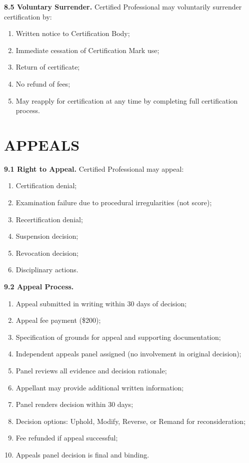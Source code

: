 \documentclass[11pt,a4paper]{article}
\begin{document}
\textbf{8.5 Voluntary Surrender.} Certified Professional may voluntarily surrender certification by:

\begin{enumerate}[label=\alph*)]
\item Written notice to Certification Body;
\item Immediate cessation of Certification Mark use;
\item Return of certificate;
\item No refund of fees;
\item May reapply for certification at any time by completing full certification process.
\end{enumerate}

\section{APPEALS}

\textbf{9.1 Right to Appeal.} Certified Professional may appeal:

\begin{enumerate}[label=\alph*)]
\item Certification denial;
\item Examination failure due to procedural irregularities (not score);
\item Recertification denial;
\item Suspension decision;
\item Revocation decision;
\item Disciplinary actions.
\end{enumerate}

\textbf{9.2 Appeal Process.}

\begin{enumerate}[label=\alph*)]
\item Appeal submitted in writing within 30 days of decision;
\item Appeal fee payment (\$200);
\item Specification of grounds for appeal and supporting documentation;
\item Independent appeals panel assigned (no involvement in original decision);
\item Panel reviews all evidence and decision rationale;
\item Appellant may provide additional written information;
\item Panel renders decision within 30 days;
\item Decision options: Uphold, Modify, Reverse, or Remand for reconsideration;
\item Fee refunded if appeal successful;
\item Appeals panel decision is final and binding.
\end{enumerate}
\end{document}
